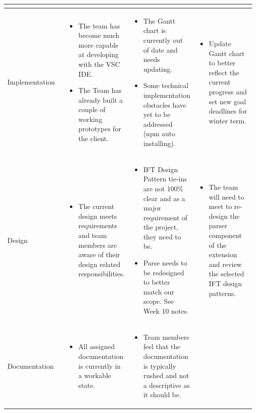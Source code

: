 \documentclass[letterpaper,10pt,titlepage,draftclsnofoot,onecolumn,onesided] {IEEEtran}
\begin{document}
\begin{center}
\begin{singlespace}
\begin{tabular}{ |  p{0.25\linewidth}  |  p{0.25\linewidth}  | p{0.25\linewidth} | p{0.25\linewidth} |}
\begin{itemize}
			\end{itemize} 
		\\ \hline
			Implementation 
		& 
			\begin{itemize}
				\item The team has become much more capable at developing with the VSC IDE.
				\item The Team has already built a couple of working prototypes for the client.
			\end{itemize}
		& 
			\begin{itemize}
				\item The Gantt chart is currently out of date and needs updating.
				\item Some technical implementation obstacles have yet to be addressed (npm auto installing).
			\end{itemize}
		&
			\begin{itemize}
				\item Update Gantt chart to better reflect the current progress and set new goal deadlines for winter term.
			\end{itemize} 
		\\ \hline
			Design 
		& 
			\begin{itemize}
				\item The current design meets requirements and team members are aware of their design related responsibilities.
			\end{itemize}
		& 
			\begin{itemize}
				\item IFT Design Pattern tie-ins are not 100\% clear and as a major requirement of the project, they need to be.
				\item Parse needs to be redesigned to better match our scope. See Week 10 notes.
			\end{itemize}
		&
			\begin{itemize}
				\item The team will need to meet to re-design the parser component of the extension and review the selected IFT design patterns.
			\end{itemize} 
		\\ \hline
			Documentation 
		& 
			\begin{itemize}
				\item All assigned documentation is currently in a workable state.
			\end{itemize}
		& 
			\begin{itemize}
				\item Team members feel that the documentation is typically rushed and not a descriptive as it should be.

\end{itemize}
\end{tabular}
\end{singlespace}
\end{center}
\end{document}
